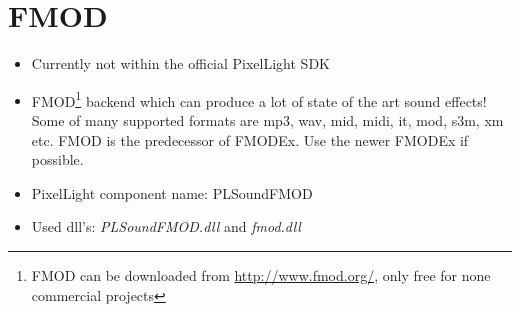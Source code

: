 \section{FMOD}
\begin{itemize}
\item Currently not within the official PixelLight SDK
\item FMOD\footnote{FMOD can be downloaded from \url{http://www.fmod.org/}, only free for none commercial projects} backend which can produce a lot of state of the art sound effects! Some of many supported formats are mp3, wav, mid, midi, it, mod, s3m, xm etc. 
FMOD is the predecessor of FMODEx. Use the newer FMODEx if possible.
\item PixelLight component name: PLSoundFMOD
\item Used dll's: \emph{PLSoundFMOD.dll} and \emph{fmod.dll}
\end{itemize}

